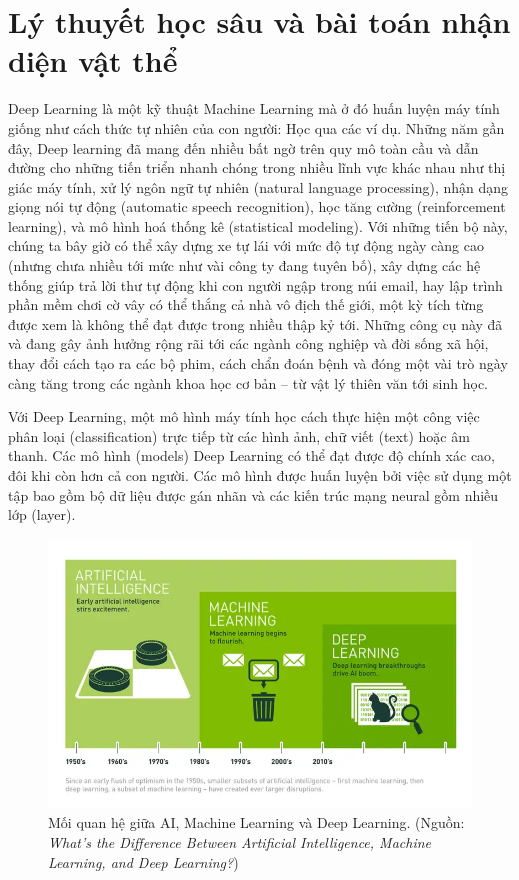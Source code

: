 \documentclass[a4paper, 12pt]{report}
\begin{document}
\chapter{Lý thuyết học sâu và bài toán nhận diện vật thể}
Deep Learning là một kỹ thuật Machine Learning mà ở đó huấn luyện máy tính giống như cách thức tự nhiên của con người: Học qua các ví dụ. Những năm gần đây, Deep learning đã mang đến nhiều bất ngờ trên quy mô toàn cầu và dẫn đường cho những tiến triển nhanh chóng trong nhiều lĩnh vực khác nhau như thị giác máy tính, xử lý ngôn ngữ tự nhiên (natural language processing), nhận dạng giọng nói tự động (automatic speech recognition), học tăng cường (reinforcement learning), và mô hình hoá thống kê (statistical modeling). Với những tiến bộ này, chúng ta bây giờ có thể xây dựng xe tự lái với mức độ tự động ngày càng cao (nhưng chưa nhiều tới mức như vài công ty đang tuyên bố), xây dựng các hệ thống giúp trả lời thư tự động khi con người ngập trong núi email, hay lập trình phần mềm chơi cờ vây có thể thắng cả nhà vô địch thế giới, một kỳ tích từng được xem là không thể đạt được trong nhiều thập kỷ tới. Những công cụ này đã và đang gây ảnh hưởng rộng rãi tới các ngành công nghiệp và đời sống xã hội, thay đổi cách tạo ra các bộ phim, cách chẩn đoán bệnh và đóng một vài trò ngày càng tăng trong các ngành khoa học cơ bản – từ vật lý thiên văn tới sinh học.\par
Với Deep Learning, một mô hình máy tính học cách thực hiện một công việc phân loại (classification) trực tiếp từ các hình ảnh, chữ viết (text) hoặc âm thanh. Các mô hình (models) Deep Learning có thể đạt được độ chính xác cao, đôi khi còn hơn cả con người. Các mô hình được huấn luyện bởi việc sử dụng một tập bao gồm bộ dữ liệu được gán nhãn và các kiến trúc mạng neural gồm nhiều lớp (layer). \par
\begin{figure}[!h]
	\centering
	\includegraphics[width=1\linewidth]{Images/aimldl}
	\caption{Mối quan hệ giữa AI, Machine Learning và Deep Learning.
		(Nguồn: \textit{What’s the Difference Between Artificial Intelligence, Machine Learning, and Deep Learning?})}
	\label{fig:aimldl}
\end{figure}
\end{document}
